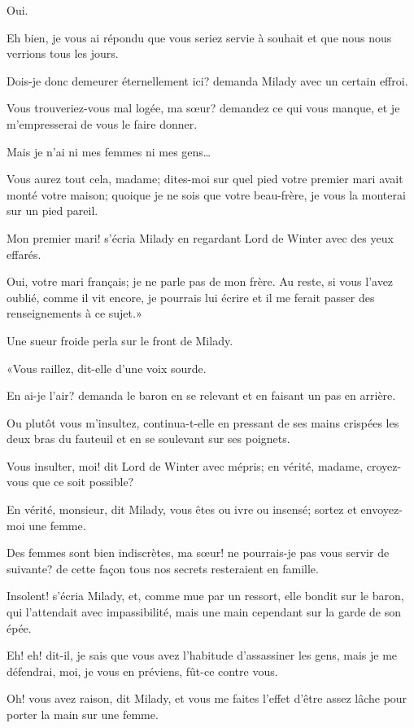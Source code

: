 \speak  Oui. 

\speak  Eh bien, je vous ai répondu que vous seriez servie à souhait et que nous nous verrions tous les jours. 

\speak  Dois-je donc demeurer éternellement ici? demanda Milady avec un certain effroi. 

\speak  Vous trouveriez-vous mal logée, ma sœur? demandez ce qui vous manque, et je m'empresserai de vous le faire donner. 

\speak  Mais je n'ai ni mes femmes ni mes gens\dots 

\speak  Vous aurez tout cela, madame; dites-moi sur quel pied votre premier mari avait monté votre maison; quoique je ne sois que votre beau-frère, je vous la monterai sur un pied pareil. 

\speak  Mon premier mari! s'écria Milady en regardant Lord de Winter avec des yeux effarés. 

\speak  Oui, votre mari français; je ne parle pas de mon frère. Au reste, si vous l'avez oublié, comme il vit encore, je pourrais lui écrire et il me ferait passer des renseignements à ce sujet.» 

Une sueur froide perla sur le front de Milady. 

«Vous raillez, dit-elle d'une voix sourde. 

\speak  En ai-je l'air? demanda le baron en se relevant et en faisant un pas en arrière. 

\speak  Ou plutôt vous m'insultez, continua-t-elle en pressant de ses mains crispées les deux bras du fauteuil et en se soulevant sur ses poignets. 

\speak  Vous insulter, moi! dit Lord de Winter avec mépris; en vérité, madame, croyez-vous que ce soit possible? 

\speak  En vérité, monsieur, dit Milady, vous êtes ou ivre ou insensé; sortez et envoyez-moi une femme. 

\speak  Des femmes sont bien indiscrètes, ma sœur! ne pourrais-je pas vous servir de suivante? de cette façon tous nos secrets resteraient en famille. 

\speak  Insolent! s'écria Milady, et, comme mue par un ressort, elle bondit sur le baron, qui l'attendait avec impassibilité, mais une main cependant sur la garde de son épée. 

\speak  Eh! eh! dit-il, je sais que vous avez l'habitude d'assassiner les gens, mais je me défendrai, moi, je vous en préviens, fût-ce contre vous. 

\speak  Oh! vous avez raison, dit Milady, et vous me faites l'effet d'être assez lâche pour porter la main sur une femme. 

